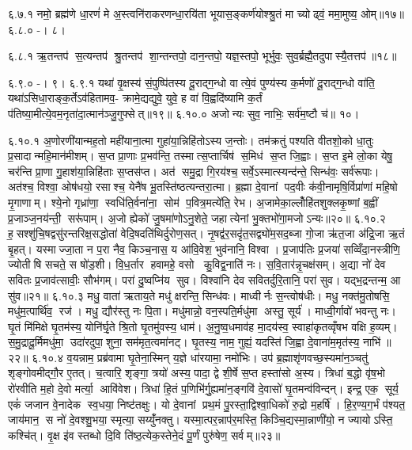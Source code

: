 ६.७.१
नमो॒ ब्रह्म॑णे धा॒रणं॑ मे अ॒स्त्वनि॑राकरणन्धा॒रयि॑ता भूयास॒ङ्कर्ण॑योश्श्रु॒तं मा च्योढ्वं॒ ममा॒मुष्य॒ ओम्॥१७॥
६.८.०
-। ८।
\anuvakamend

६.८.१
ऋ॒तन्तप॑ स॒त्यन्तप॑ श्रु॒तन्तप॑ शा॒न्तन्तपो॒ दान॒न्तपो॒ यज्ञ॒स्तपो॒ भूर्भुवः॒ सुव॒र्ब्रह्मै॒तदुपास्यै॒तत्तप॑॥१८॥
\anuvakamend

६.९.०
-। ९।
६.९.१
यथा॑ वृ॒क्षस्य॑ सं॒पुष्पि॑तस्य दू॒राद्ग॒न्धो वात्ये॒वं पुण्य॑स्य क॒र्मणो॑ दू॒राद्ग॒न्धो वा॑ति॒ यथा॑ऽसिधा॒राङ्क॒र्तेऽव॑हितामव॒- क्रामे॒द्यद्युवे॒ युवे॒ ह वा॑ वि॒ह्वदि॑ष्यामि क॒र्तं प॑तिष्या॒मीत्ये॒वम॒नृता॑दा॒त्मान॑ञ्जु॒गुफ्सेत्॥१९॥
६.१०.०
अजोन्यः सुव॒ नाभिः॒ सर्व॑म॒ष्टौ च॑॥ १०।
\anuvakamend

६.१०.१
अ॒णोरणी॑यान्मह॒तो मही॑याना॒त्मा गुहा॑या॒न्निहि॑तोऽस्य ज॒न्तोः। तम॑क्रतुं पश्यति वीतशो॒को धा॒तुः प्र॒सादान्महि॒मान॑मीशम्। स॒प्त प्रा॒णाः प्र॒भव॑न्ति॒ तस्मात्स॒प्तार्चिष॑ स॒मिध॑ स॒प्त जि॒ह्वाः। स॒प्त इ॒मे लो॒का येषु॒ चर॑न्ति प्रा॒णा गु॒हाश॑या॒न्निहि॑ताः स॒प्तस॑प्त। अत॑ समु॒द्रा गि॒रय॑श्च॒ सर्वे॒ऽस्मात्स्यन्द॑न्ते॒ सिन्ध॑वः॒ सर्व॑रूपाः। अत॑श्च॒ विश्वा॒ ओष॑धयो॒ रसाश्च॒ येनै॑ष भू॒तस्ति॑ष्ठत्यन्तरा॒त्मा। ब्र॒ह्मा दे॒वानां पद॒वीः क॑वी॒नामृषि॒र्विप्रा॑णां महि॒षो मृ॒गाणाम्। श्ये॒नो गृध्रा॑णा॒ स्वधि॑ति॒र्वना॑ना॒ सोम॑ प॒वित्र॒मत्ये॑ति॒ रेभ\sn{}। अ॒जामेका॒ल्लोँहि॑तशुक्लकृ॒ष्णां ब॒ह्वीं प्र॒जाञ्ज॒नय॑न्ती॒ सरू॑पाम्। अ॒जो ह्येको॑ जु॒षमा॑णोऽनु॒शेते॒ जहात्येनां भु॒क्तभो॑गा॒मजोऽन्यः॥२०॥
६.१०.२
ह॒सश्शु॑चि॒षद्वसु॑रन्तरिक्ष॒सद्धोता॑ वेदि॒षदति॑थिर्दुरोण॒सत्। नृ॒षद्व॑र॒सदृ॑त॒सद्व्यो॑म॒सद॒ब्जा गो॒जा ऋ॑त॒जा अ॑द्रि॒जा ऋ॒तं बृ॒हत्। यस्माज्जा॒ता न प॒रा नैव॒ किञ्च॒नास॒ य आ॑वि॒वेश॒ भुव॑नानि॒ विश्वा। प्र॒जाप॑तिः प्र॒जया॑ सव्विँदा॒नस्त्रीणि॒ ज्योतीषि सचते॒ स षो॑ड॒शी। वि॒ध॒र्तार हवामहे॒ वसो कु॒विद्व॒नाति॑ नः। स॒वि॒तार॑न्नृ॒चक्ष॑सम्। अ॒द्या नो॑ देव सवितः प्र॒जाव॑त्सावीः॒ सौभ॑गम्। परा॑ दु॒ष्वप्नि॑य सुव। विश्वा॑नि देव सवितर्दुरि॒तानि॒ परा॑ सुव। यद्भ॒द्रन्तन्म॒ आ सु॑व॥२१॥
६.१०.३
मधु॒ वाता॑ ऋताय॒ते मधु॑ क्षरन्ति॒ सिन्ध॑वः। माध्वीर्नः स॒न्त्वोष॑धीः। मधु॒ नक्त॑मु॒तोषसि॒ मधु॑म॒त्पार्थि॑व॒ रज॑। मधु॒ द्यौर॑स्तु नः पि॒ता। मधु॑मान्नो॒ वन॒स्पति॒र्मधु॑मा अस्तु॒ सूर्य॑। माध्वी॒र्गावो॑ भवन्तु नः। घृ॒तं मि॑मिक्षे घृ॒तम॑स्य॒ योनि॑र्घृ॒ते श्रि॒तो घृ॒तमु॑वस्य॒ धाम॑। अ॒नु॒ष्व॒धमाव॑ह मा॒दय॑स्व॒ स्वाहा॑कृतव्वृँषभ वक्षि ह॒व्यम्। स॒मु॒द्रादू॒र्मिमधु॑मा॒ उदा॑रदुपा॒शुना॒ सम॑मृत॒त्वमा॑नट्। घृ॒तस्य॒ नाम॒ गुह्यं॒ यदस्ति॑ जि॒ह्वा दे॒वाना॑म॒मृत॑स्य॒ नाभि॑॥२२॥
६.१०.४
व॒यन्नाम॒ प्रब्र॑वामा घृ॒तेना॒स्मिन् य॒ज्ञे धा॑रयामा॒ नमो॑भिः। उप॑ ब्र॒ह्माशृ॑णवच्छ॒स्यमा॑न॒ञ्चतु॑ शृङ्गोवमीद्गौ॒र ए॒तत्। च॒त्वारि॒ शृङ्गा॒ त्रयो॑ अस्य॒ पादा॒ द्वे शी॒र्\mbox{}षे स॒प्त हस्ता॑सो अ॒स्य। त्रिधा॑ ब॒द्धो वृ॑ष॒भो रो॑रवीति म॒हो दे॒वो मर्त्या॒ आवि॑वेश। त्रिधा॑ हि॒तं प॒णिभि॑र्गु॒ह्यमा॑न॒ङ्गवि॑ दे॒वासो॑ घृ॒तमन्व॑विन्दन्। इन्द्र॒ एक॒ सूर्य॒ एकं॑ जजान वे॒नादेक स्व॒धया॒ निष्ट॑तक्षुः। यो दे॒वानां प्रथ॒मं पु॒रस्ता॒द्विश्वा॒धिको॑ रु॒द्रो म॒हर्\mbox{}षि॑। हि॒र॒ण्य॒ग॒र्भं प॑श्यत॒ जाय॑मान॒ स नो॑ दे॒वश्शु॒भया॒ स्मृत्या॒ सय्युँ॑नक्तु। यस्मा॒त्पर॒न्नाप॑र॒मस्ति॒ किञ्चि॒द्यस्मा॒न्नाणी॑यो॒ न ज्यायोऽस्ति॒ कश्चि॑त्। वृ॒क्ष इ॑व स्तब्धो दि॒वि ति॑ष्ठ॒त्येक॒स्तेने॒दं पू॒र्णं पुरु॑षेण॒ सर्वम्॥२३॥
